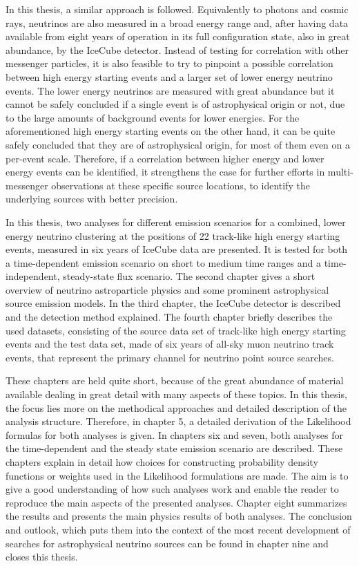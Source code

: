 In this thesis, a similar approach is followed.
Equivalently to photons and cosmic rays, neutrinos are also measured in a broad energy range and, after having data available from eight years of operation in its full configuration state, also in great abundance, by the IceCube detector.
Instead of testing for correlation with other messenger particles, it is also feasible to try to pinpoint a possible correlation between high energy starting events and a larger set of lower energy neutrino events.
The lower energy neutrinos are measured with great abundance but it cannot be safely concluded if a single event is of astrophysical origin or not, due to the large amounts of background events for lower energies.
For the aforementioned high energy starting events on the other hand, it can be quite safely concluded that they are of astrophysical origin, for most of them even on a per-event scale.
Therefore, if a correlation between higher energy and lower energy events can be identified, it strengthens the case for further efforts in multi-messenger observations at these specific source locations, to identify the underlying sources with better precision.

In this thesis, two analyses for different emission scenarios for a combined, lower energy neutrino clustering at the positions of 22 track-like high energy starting events, measured in six years of IceCube data are presented.
It is tested for both a time-dependent emission scenario on short to medium time ranges and a time-independent, steady-state flux scenario.
The second chapter gives a short overview of neutrino astroparticle physics and some prominent astrophysical source emission models.
In the third chapter, the IceCube detector is described and the detection method explained.
The fourth chapter briefly describes the used datasets, consisting of the source data set of track-like high energy starting events and the test data set, made of six years of all-sky muon neutrino track events, that represent the primary channel for neutrino point source searches.

These chapters are held quite short, because of the great abundance of material available dealing in great detail with many aspects of these topics.
In this thesis, the focus lies more on the methodical approaches and detailed description of the analysis structure.
Therefore, in chapter 5, a detailed derivation of the Likelihood formulas for both analyses is given.
In chapters six and seven, both analyses for the time-dependent and the steady state emission scenario are described.
These chapters explain in detail how choices for constructing probability density functions or weights used in the Likelihood formulations are made.
The aim is to give a good understanding of how such analyses work and enable the reader to reproduce the main aspects of the presented analyses.
Chapter eight summarizes the results and presents the main physics results of both analyses.
The conclusion and outlook, which puts them into the context of the most recent development of searches for astrophysical neutrino sources can be found in chapter nine and closes this thesis.
